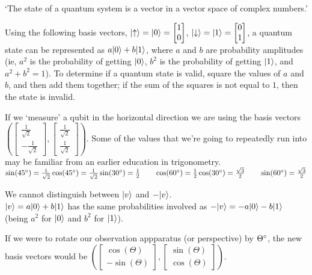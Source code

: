 
`The state of a quantum system is a vector in a vector space of complex numbers.'

Using the following basis vectors, $\lvert\uparrow\rangle = \lvert0\rangle = \begin{bmatrix}
    1\\
    0
\end{bmatrix}$, $\lvert\downarrow\rangle = \lvert1\rangle = \begin{bmatrix}
    0\\
    1
\end{bmatrix}$, a quantum state can be represented as $a\lvert0\rangle + b\lvert1\rangle$, where $a$ and $b$ are probability amplitudes (ie, $a^2$ is the probability of getting $\lvert0\rangle$, $b^2$ is the probability of getting $\lvert1\rangle$, and $a^2 + b^2 = 1$). To determine if a quantum state is valid, square the values of $a$ and $b$, and then add them together; if the sum of the squares is not equal to $1$, then the state is invalid.

If we `measure' a qubit in the horizontal direction we are using the basis vectors $(\begin{bmatrix}
    \frac{1}{\sqrt{2}}\\
    -\frac{1}{\sqrt{2}}
\end{bmatrix}, \begin{bmatrix}
    \frac{1}{\sqrt{2}}\\
    \frac{1}{\sqrt{2}}
\end{bmatrix})$.
Some of the values that we're going to repeatedly run into may be familiar from an earlier education in trigonometry.\\
$\sin(45\degree) = \frac{1}{\sqrt{2}}\\
\cos(45\degree) = \frac{1}{\sqrt{2}}\\
\sin(30\degree) = \frac{1}{2} \qquad \cos(60\degree) = \frac{1}{2}\\
\cos(30\degree) = \frac{\sqrt{3}}{2} \qquad \sin(60\degree) = \frac{\sqrt{3}}{2}$\\

\begin{note}
    We cannot distinguish between $\lvert v\rangle$ and $-\lvert v\rangle$.\\
    $\lvert v\rangle = a\lvert0\rangle + b\lvert1\rangle$ has the same probabilities involved as $-\lvert v\rangle = -a\lvert0\rangle - b\lvert1\rangle$ (being $a^2$ for $\lvert0\rangle$ and $b^2$ for $\lvert1\rangle$).
\end{note}

If we were to rotate our observation appparatus (or perspective) by $\Theta\degree$, the new basis vectors would be $(\begin{bmatrix}
    \cos(\Theta)\\
    -\sin(\Theta)
\end{bmatrix}, \begin{bmatrix}
    \sin(\Theta)\\
    \cos(\Theta)
\end{bmatrix})$.

